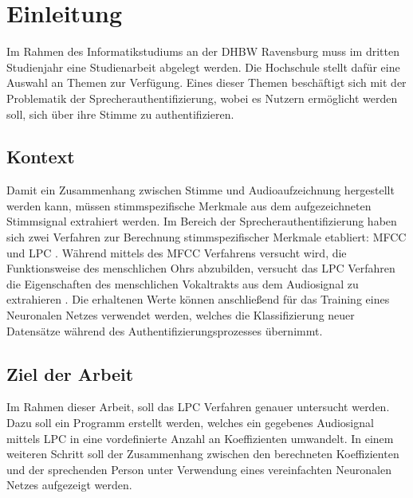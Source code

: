 \section{Einleitung}\label{sec:Einleitung}
% 
Im Rahmen des Informatikstudiums an der \ac{DHBW} Ravensburg muss im dritten Studienjahr eine Studienarbeit abgelegt werden.
Die Hochschule stellt dafür eine Auswahl an Themen zur Verfügung.
Eines dieser Themen beschäftigt sich mit der Problematik der Sprecherauthentifizierung, wobei es Nutzern ermöglicht werden soll, sich über ihre Stimme zu authentifizieren.

\subsection{Kontext}
Damit ein Zusammenhang zwischen Stimme und Audioaufzeichnung hergestellt werden kann, müssen stimm\-spezifische Merkmale aus dem aufgezeichneten Stimmsignal extrahiert werden.
Im Bereich der Sprecherauthentifizierung haben sich zwei Verfahren zur Berechnung stimm\-spezifischer Merkmale etabliert: \ac{MFCC} und \ac{LPC} \autocite[vgl.][S. 116]{sidorov_text-independent_2010}\autocite[vgl.][S. 726]{chelali_text_2017}.
Während mittels des \ac{MFCC} Verfahrens versucht wird, die Funktionsweise des menschlichen Ohrs abzubilden, versucht das \ac{LPC} Verfahren die Eigenschaften des menschlichen Vokaltrakts aus dem Audiosignal zu extrahieren \autocite[vgl.][S. 117]{sidorov_text-independent_2010}.
Die erhaltenen Werte können anschließend für das Training eines Neuronalen Netzes verwendet werden, welches die Klassifizierung neuer Datensätze während des Authentifizierungsprozesses übernimmt.

\subsection{Ziel der Arbeit}
Im Rahmen dieser Arbeit, soll das \ac{LPC} Verfahren genauer untersucht werden.
Dazu soll ein Programm erstellt werden, welches ein gegebenes Audiosignal mittels \ac{LPC} in eine vordefinierte Anzahl an Koeffizienten umwandelt.
In einem weiteren Schritt soll der Zusammenhang zwischen den berechneten Koeffizienten und der sprechenden Person unter Verwendung eines vereinfachten Neuronalen Netzes aufgezeigt werden.


